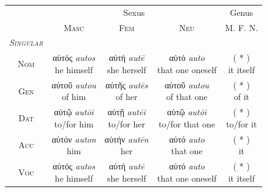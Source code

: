 \documentclass[10pt,a4paper,notitlepage]{article}
\newcommand{\tsc}[1]{\textsc{#1}}
\newcommand*{\grc}[1]{\fontspec{Inter}#1\rmfamily}
\newcommand{\trc}[1]{\textit{\fontspec{Tinos}#1}}
\begin{document}
    \begin{table}[H]
        \begin{tabular}{c|ccc|c}
            & \multicolumn{3}{c|}{Sexus} & Genus \\
            & \tsc{Masc} & \tsc{Fem} & \tsc{Neu} & \tsc{M. F. N.} \\
            \hline
            \emph{\tsc{Singular}} & & & & \\
            \tsc{Nom} & \makecell{\grc{αὐτός} \trc{autos} \\ \small he himself} & \makecell{\grc{αὐτή} \trc{autē} \\ \small she herself} & \makecell{\grc{αὐτό} \trc{auto} \\ \small that one oneself} & \makecell{( * ) \\ \small it itself} \\
            \tsc{Gen} & \makecell{\grc{αὐτοῦ} \trc{autou} \\ \small of him} & \makecell{\grc{αὐτῆς} \trc{autēs} \\ \small of her} & \makecell{\grc{αὐτοῦ} \trc{autou} \\ \small of that one} & \makecell{( * ) \\ \small of it} \\
            \tsc{Dat} & \makecell{\grc{αὐτῷ} \trc{autōi} \\ \small to/for him} & \makecell{\grc{αὐτῇ} \trc{autēi} \\ \small to/for her} & \makecell{\grc{αὐτῷ} \trc{autōi} \\ \small to/for that one} & \makecell{( * ) \\ \small to/for it} \\
            \tsc{Acc} & \makecell{\grc{αὐτόν} \trc{auton} \\ \small him} & \makecell{\grc{αὐτήν} \trc{autēn} \\ \small her} & \makecell{\grc{αὐτό} \trc{auto} \\ \small that one} & \makecell{( * ) \\ \small it} \\
            \tsc{Voc} & \makecell{\grc{αὐτός} \trc{autos} \\ \small he himself} & \makecell{\grc{αὐτή} \trc{autē} \\ \small she herself} & \makecell{\grc{αὐτό} \trc{auto} \\ \small that one oneself} & \makecell{( * ) \\ \small it itself} \\


\end{tabular}
\end{table}
\end{document}
